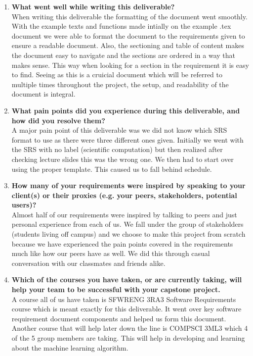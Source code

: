 \documentclass{scrreprt}
\theoremstyle{definition}
\begin{document}
% 

\begin{enumerate}
  \item \textbf{What went well while writing this deliverable?} \\
When writing this deliverable the formatting of the document went smoothly. With the example texts and functions made intially on the example .tex document we were able to format the document to the requirements given to ensure a readable document. Also, the sectioning and table of content makes the document easy to navigate and the sections are ordered in a way that makes sense. This way when looking for a section in the requirement it is easy to find. Seeing as this is a cruicial document which will be referred to multiple times throughout the project, the setup, and readability of the document is integral.
  \item \textbf{What pain points did you experience during this deliverable, and how did
  you resolve them?}\\
A major pain point of this deliverable was we did not know which SRS format to use as there were three different ones given. Initially we went with the SRS with no label (scientific computation) but then realized after checking lecture slides this was the wrong one. We then had to start over using the proper template. This caused us to fall behind schedule.
  \item \textbf{How many of your requirements were inspired by speaking to your
  client(s) or their proxies (e.g. your peers, stakeholders, potential users)?}\\
Almost half of our requirements were inspired by talking to peers and just personal experience from each of us. We fall under the group of stakeholders (students living off campus) and we choose to make this project from scratch because we have experienced the pain points covered in the requirements much like how our peers have as well. We did this through casual conversation with our classmates and friends alike.
  \item \textbf{Which of the courses you have taken, or are currently taking, will help
  your team to be successful with your capstone project.}\\
A course all of us have taken is SFWRENG 3RA3 Software Requirements course which is meant exactly for this deliverable. It went over key software requirement document components and helped us form this document. Another course that will help later down the line is COMPSCI 3ML3 which 4 of the 5 group members are taking. This will help in developing and learning about the machine learning algorithm.

\end{enumerate}
\end{document}
